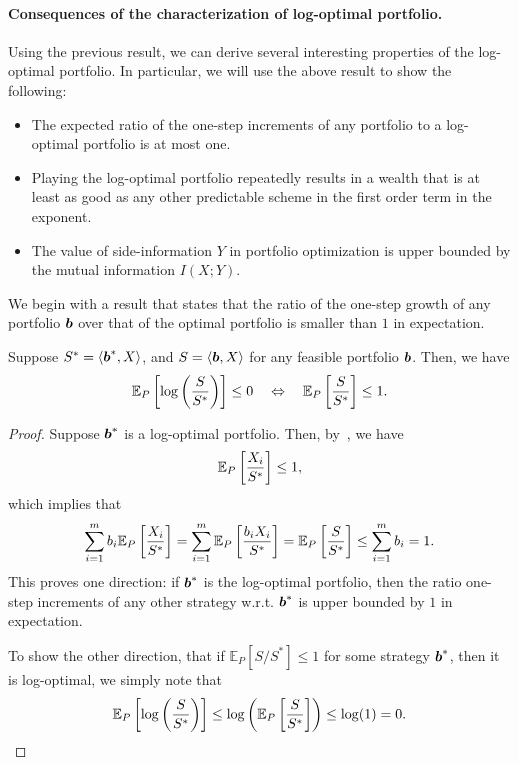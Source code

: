     \paragraph{Consequences of the characterization of log-optimal portfolio.} Using the previous result, we can derive several interesting properties of the log-optimal portfolio. In particular, we will use the above result to show the following: 
    \begin{itemize}
        \item The expected ratio of the one-step increments of any portfolio to a log-optimal portfolio is at most one. 
        \item Playing the log-optimal portfolio repeatedly results in a wealth that is at least as good as any other predictable scheme in the first order term in the exponent. 
        \item The value of side-information $Y$ in portfolio optimization is upper bounded by the mutual information $I(X;Y)$. 
    \end{itemize}
    
    We begin with a result that states that the ratio of the one-step growth of any portfolio $\boldsymbol{b}$ over that of the optimal portfolio is smaller than $1$ in expectation. 
    \begin{corollary}
        \label{corollary:optimal-portfolio-2} Suppose $S^* = \langle \boldsymbol{b}^*, X\rangle$, and $S = \langle \boldsymbol{b}, X \rangle$ for any feasible portfolio $\boldsymbol{b}$. Then, we have 
        \begin{align}
            \mathbb{E}_P\left[ \log \left( \frac{S}{S^*} \right) \right] \leq 0 \quad \Leftrightarrow \quad \mathbb{E}_P \left[ \frac{S}{S^*} \right] \leq 1. 
        \end{align}
    \end{corollary}
    \begin{proof}
        Suppose $\boldsymbol{b}^*$ is a log-optimal portfolio. Then, by~, we have 
        \begin{align}
            \mathbb{E}_P\left[ \frac{X_i}{S^*} \right] \leq 1, 
        \end{align}
        which implies that 
        \begin{align}
            \sum_{i=1}^m b_i \mathbb{E}_P\left[ \frac{X_i}{S^*} \right] = \sum_{i=1}^m  \mathbb{E}_P\left[ \frac{ b_i X_i}{S^*} \right] = \mathbb{E}_P \left[ \frac{S}{S^*} \right] \leq \sum_{i=1}^m b_i = 1. 
        \end{align}
        This proves one direction: if $\boldsymbol{b}^*$ is the log-optimal portfolio, then the ratio one-step increments of any other strategy w.r.t. $\boldsymbol{b}^*$ is upper bounded by $1$ in expectation. 

        To show the other direction, that if $\mathbb{E}_P[S/S^*] \leq 1$ for some strategy $\boldsymbol{b}^*$, then it is log-optimal, we simply note that 
        \begin{align}
            \mathbb{E}_P\left[ \log \left( \frac{S}{S^*} \right) \right] \leq \log \left( \mathbb{E}_P\left[ \frac{S}{S^*} \right] \right) \leq \log(1) = 0. 
        \end{align}
    \end{proof}

